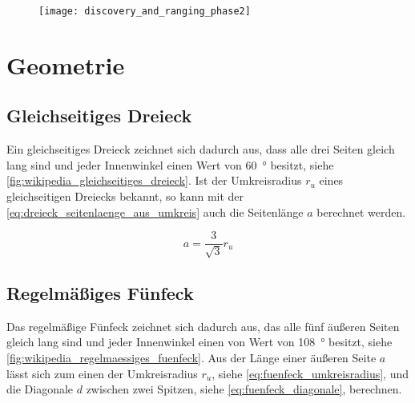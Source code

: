 \begin{figure}
	\centering
	\texttt{[image: discovery\_and\_ranging\_phase2]}
	\label{fig:discovery_and_ranging_phase}
\end{figure}


%
%
%
\section{Geometrie}


%
%
%
\subsection{Gleichseitiges Dreieck}

Ein gleichseitiges Dreieck zeichnet sich dadurch aus, dass alle drei Seiten gleich lang sind und jeder Innenwinkel einen Wert von \SI{60}{\degree} besitzt, siehe \autoref{fig:wikipedia_gleichseitiges_dreieck}. Ist der Umkreisradius $r_u$ eines gleichseitigen Dreiecks bekannt, so kann mit der \autoref{eq:dreieck_seitenlaenge_aus_umkreis} auch die Seitenlänge $a$ berechnet werden.

\begin{equation}
a = \frac{3}{\sqrt{3}} r_u \label{eq:dreieck_seitenlaenge_aus_umkreis}
\end{equation}


%
%
%
\subsection{Regelmäßiges Fünfeck}

Das regelmäßige Fünfeck zeichnet sich dadurch aus, das alle fünf äußeren Seiten gleich lang sind und jeder Innenwinkel einen von Wert von \SI{108}{\degree} besitzt, siehe \autoref{fig:wikipedia_regelmaessiges_fuenfeck}. Aus der Länge einer äußeren Seite $a$ lässt sich zum einen der Umkreisradius $r_u$, siehe \autoref{eq:fuenfeck_umkreisradius}, und die Diagonale $d$ zwischen zwei Spitzen, siehe \autoref{eq:fuenfeck_diagonale}, berechnen.

